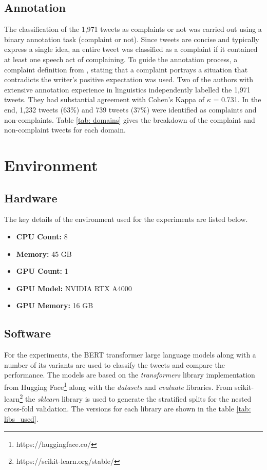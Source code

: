 \subsection{Annotation}
The classification of the 1,971 tweets as complaints or not was carried out using a binary annotation task (complaint or not). Since tweets are concise and typically express a single idea, an entire tweet was classified as a complaint if it contained at least one speech act of complaining. To guide the annotation process, a complaint definition from \cite{olshtain_speechact_1987}, stating that a complaint portrays a situation that contradicts the writer's positive expectation was used. Two of the authors with extensive annotation experience in linguistics independently labelled the 1,971 tweets. They had substantial agreement \cite{artsteinInterCoderAgreementComputational2008} with Cohen's Kappa of $\kappa$ = 0.731. In the end, 1,232 tweets (63\%) and 739 tweets (37\%) were identified as complaints and non-complaints. Table \ref{tab: domains} gives the breakdown of the complaint and non-complaint tweets for each domain.

\section{Environment}

\subsection{Hardware}
The key details of the environment used for the experiments are listed below.
\begin{itemize}
    \small
    \item \textbf{CPU Count:} 8
    \item \textbf{Memory:} 45 GB
    \item \textbf{GPU Count:} 1
    \item \textbf{GPU Model:} NVIDIA RTX A4000
    \item \textbf{GPU Memory:} 16 GB
\end{itemize}

\subsection{Software}
For the experiments, the BERT transformer large language models along with a number of its variants are used to classify the tweets and compare the performance. The models are based on the \textit{transformers} library implementation from Hugging Face\footnote{https://huggingface.co/} along with the \textit{datasets} and \textit{evaluate} libraries. From scikit-learn\footnote{https://scikit-learn.org/stable/} the \textit{sklearn} library is used to generate the stratified splits for the nested cross-fold validation. The versions for each library are shown in the table \ref{tab: libs_used}.

